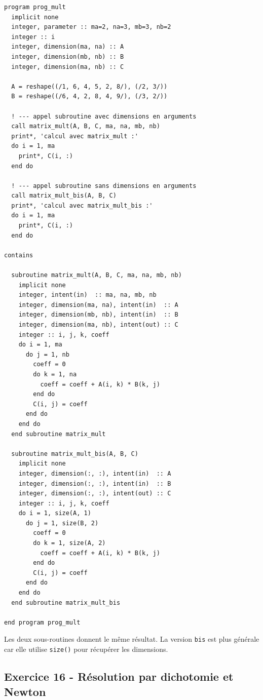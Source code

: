 \documentclass[12pt,a4paper]{article}
\begin{document}
\begin{boitecorrige}
\begin{lstlisting}
program prog_mult
  implicit none
  integer, parameter :: ma=2, na=3, mb=3, nb=2
  integer :: i
  integer, dimension(ma, na) :: A
  integer, dimension(mb, nb) :: B
  integer, dimension(ma, nb) :: C

  A = reshape((/1, 6, 4, 5, 2, 8/), (/2, 3/))
  B = reshape((/6, 4, 2, 8, 4, 9/), (/3, 2/))

  ! --- appel subroutine avec dimensions en arguments
  call matrix_mult(A, B, C, ma, na, mb, nb)
  print*, 'calcul avec matrix_mult :'
  do i = 1, ma
    print*, C(i, :)
  end do

  ! --- appel subroutine sans dimensions en arguments
  call matrix_mult_bis(A, B, C)
  print*, 'calcul avec matrix_mult_bis :'
  do i = 1, ma
    print*, C(i, :)
  end do

contains

  subroutine matrix_mult(A, B, C, ma, na, mb, nb)
    implicit none
    integer, intent(in)  :: ma, na, mb, nb
    integer, dimension(ma, na), intent(in)  :: A
    integer, dimension(mb, nb), intent(in)  :: B
    integer, dimension(ma, nb), intent(out) :: C
    integer :: i, j, k, coeff
    do i = 1, ma
      do j = 1, nb
        coeff = 0
        do k = 1, na
          coeff = coeff + A(i, k) * B(k, j)
        end do
        C(i, j) = coeff
      end do
    end do
  end subroutine matrix_mult

  subroutine matrix_mult_bis(A, B, C)
    implicit none
    integer, dimension(:, :), intent(in)  :: A
    integer, dimension(:, :), intent(in)  :: B
    integer, dimension(:, :), intent(out) :: C
    integer :: i, j, k, coeff
    do i = 1, size(A, 1)
      do j = 1, size(B, 2)
        coeff = 0
        do k = 1, size(A, 2)
          coeff = coeff + A(i, k) * B(k, j)
        end do
        C(i, j) = coeff
      end do
    end do
  end subroutine matrix_mult_bis

end program prog_mult
\end{lstlisting}

Les deux sous-routines donnent le même résultat. La version \texttt{bis} est plus générale car elle utilise \texttt{size()} pour récupérer les dimensions.
\end{boitecorrige}

\subsection*{Exercice 16 - Résolution par dichotomie et Newton \niveau{\difficile}}
\end{document}
